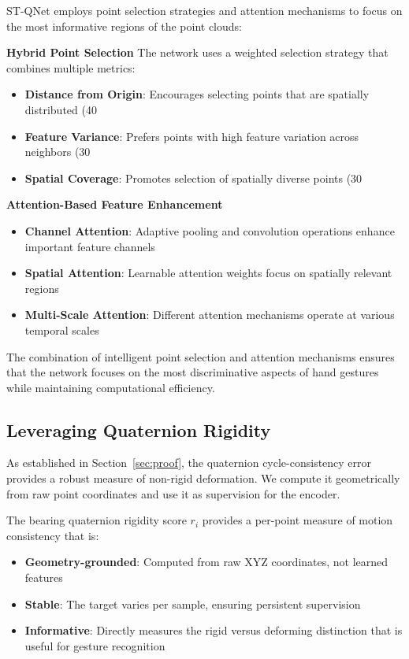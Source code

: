 \documentclass[journal]{IEEEtran}
\theoremstyle{plain}
\begin{document}
ST-QNet employs point selection strategies and attention mechanisms to focus on the most informative regions of the point clouds:

\textbf{Hybrid Point Selection}
The network uses a weighted selection strategy that combines multiple metrics:
\begin{itemize}
    \item \textbf{Distance from Origin}: Encourages selecting points that are spatially distributed (40%
    \item \textbf{Feature Variance}: Prefers points with high feature variation across neighbors (30%
    \item \textbf{Spatial Coverage}: Promotes selection of spatially diverse points (30%
\end{itemize}

\textbf{Attention-Based Feature Enhancement}
\begin{itemize}
    \item \textbf{Channel Attention}: Adaptive pooling and convolution operations enhance important feature channels
    \item \textbf{Spatial Attention}: Learnable attention weights focus on spatially relevant regions
    \item \textbf{Multi-Scale Attention}: Different attention mechanisms operate at various temporal scales
\end{itemize}

The combination of intelligent point selection and attention mechanisms ensures that the network focuses on the most discriminative aspects of hand gestures while maintaining computational efficiency.

\subsection{Leveraging Quaternion Rigidity}
As established in Section~\ref{sec:proof}, the quaternion cycle-consistency error provides a robust measure of non-rigid deformation. We compute it geometrically from raw point coordinates and use it as supervision for the encoder.

The bearing quaternion rigidity score $r_i$ provides a per-point measure of motion consistency that is:
\begin{itemize}
    \item \textbf{Geometry-grounded}: Computed from raw XYZ coordinates, not learned features
    \item \textbf{Stable}: The target varies per sample, ensuring persistent supervision
    \item \textbf{Informative}: Directly measures the rigid versus deforming distinction that is useful for gesture recognition
\end{itemize}
\end{document}

